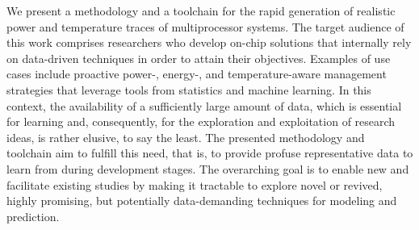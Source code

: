 We present a methodology and a toolchain for the rapid generation of realistic
power and temperature traces of multiprocessor systems. The target audience of
this work comprises researchers who develop on-chip solutions that internally
rely on data-driven techniques in order to attain their objectives. Examples of
use cases include proactive power-, \mbox{energy-,} and temperature-aware
management strategies that leverage tools from statistics and machine learning.
In this context, the availability of a sufficiently large amount of data, which
is essential for learning and, consequently, for the exploration and
exploitation of research ideas, is rather elusive, to say the least. The
presented methodology and toolchain aim to fulfill this need, that is, to
provide profuse representative data to learn from during development stages. The
overarching goal is to enable new and facilitate existing studies by making it
tractable to explore novel or revived, highly promising, but potentially
data-demanding techniques for modeling and prediction.
